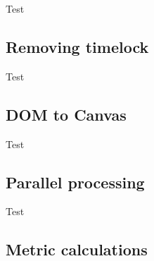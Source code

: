 \documentclass[ draft,
                    author={Alexander Hill},
                supervisor={Dr. Benjamin Sach},
                    degree={MEng},
                     title={MARMOSET: Multi Agent Real-time Multi-core Online
                     Simulation for Efficient Transportation},
                  subtitle={},
                      type={research},
                      year={2016} ]{dissertation}
\begin{document}
Test

\subsection{Removing timelock}

Test

\subsection{DOM to Canvas}

Test

\subsection{Parallel processing}

Test

\subsection{Metric calculations}



\end{document}
